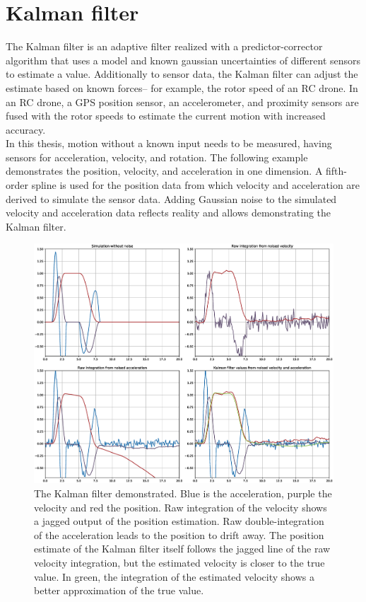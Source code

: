 \section{Kalman filter}
\label{sec:Kalmanfilter}
The Kalman filter is an adaptive filter realized with a predictor-corrector algorithm that uses a model and known gaussian uncertainties of different sensors to estimate a value. Additionally to sensor data, the Kalman filter can adjust the estimate based on known forces– for example, the rotor speed of an RC drone. In an RC drone, a GPS position sensor, an accelerometer, and proximity sensors are fused with the rotor speeds to estimate the current motion with increased accuracy.\\
In this thesis, motion without a known input needs to be measured, having sensors for acceleration, velocity, and rotation. The following example demonstrates the position, velocity, and acceleration in one dimension. A fifth-order spline is used for the position data from which velocity and acceleration are derived to simulate the sensor data. Adding Gaussian noise to the simulated velocity and acceleration data reflects reality and allows demonstrating the Kalman filter.
\begin{figure}[H]
    \centering
    \includegraphics[width=1.0\textwidth]{images/Kalman_example_1d.eps}
    \caption{The Kalman filter demonstrated. Blue is the acceleration, purple the velocity and red the position. Raw integration of the velocity shows a jagged output of the position estimation. Raw double-integration of the acceleration leads to the position to drift away. The position estimate of the Kalman filter itself follows the jagged line of the raw velocity integration, but the estimated velocity is closer to the true value. In green, the integration of the estimated velocity shows a better approximation of the true value.}
    \label{im:KalmanFilter1D}
\end{figure}
